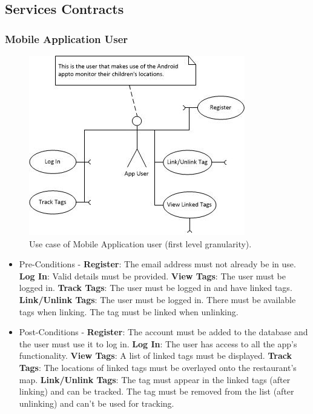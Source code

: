 \documentclass[11pt,titlepage]{article} %
\begin{document}
\subsection{Services Contracts}
\subsubsection{Mobile Application User}

\begin{figure}[H]
\centering
\includegraphics[scale=1]{AppUser.jpg}
\caption{Use case of Mobile Application user (first level granularity).}
\end{figure}

\begin{itemize}
\item Pre-Conditions - \textbf{Register}: The email address must not already be in use. \textbf{Log In}: Valid details must be provided. \textbf{View Tags}: The user must be logged in. \textbf{Track Tags}: The user must be logged in and have linked tags. \textbf{Link/Unlink Tags}: The user must be logged in. There must be available tags when linking. The tag must be linked when unlinking.
\item Post-Conditions - \textbf{Register}: The account must be added to the database and the user must use it to log in. \textbf{Log In}: The user has access to all the app's functionality. \textbf{View Tags}: A list of linked tags must be displayed. \textbf{Track Tags}: The locations of linked tags must be overlayed onto the restaurant's map. \textbf{Link/Unlink Tags}: The tag must appear in the linked tags (after linking) and can be tracked. The tag must be removed from the list (after unlinking) and can't be used for tracking.
\end{itemize}
\end{document}

